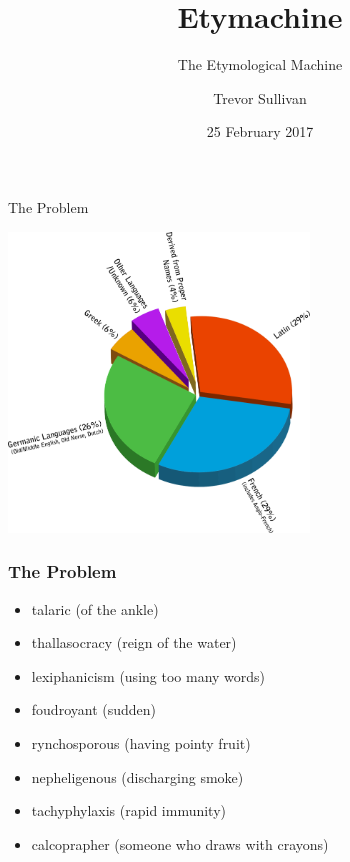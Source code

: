 \documentclass[10pt]{beamer}
\title{Etymachine}
\subtitle{The Etymological Machine}
\date{25 February 2017}
\author{Trevor Sullivan}
\institute{University of Arizona}
\begin{document}
\maketitle


\begin{frame}[fragile]{The Problem}

  \includegraphics[width=8cm]{badchart.png}


\end{frame}

\begin{frame}[fragile]
  \frametitle{The Problem}

  \begin{itemize}[<+->]
      \item talaric \pause (of the ankle)
      \item thallasocracy \pause (reign of the water)
      \item lexiphanicism \pause (using too many words)
      \item foudroyant \pause (sudden)
      \item rynchosporous \pause (having pointy fruit)
      \item nepheligenous \pause (discharging smoke)
      \item tachyphylaxis \pause (rapid immunity)
      \item calcoprapher \pause (someone who draws with crayons)
    \end{itemize}
\end{frame}
\end{document}
